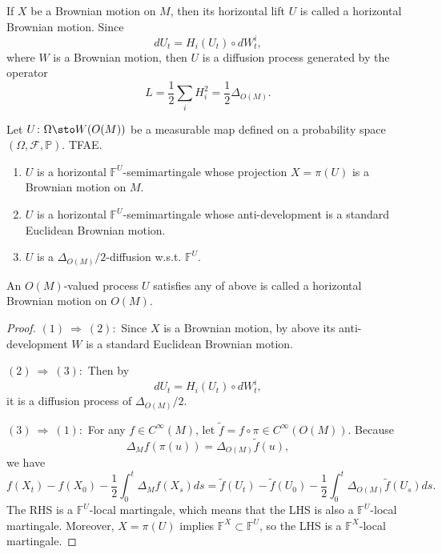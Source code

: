 If $X$ be a Brownian motion on $M$, then its horizontal lift $U$ is called a horizontal Brownian motion. Since
\begin{equation*}
    dU_t = H_i(U_t) \circ dW^i_t,
\end{equation*}
where $W$ is a Brownian motion, then $U$ is a diffusion process generated by the operator
\begin{equation*}
    L = \frac{1}{2} \sum_i H_i^2 = \frac{1}{2}\Delta_{O(M)}.
\end{equation*}

\begin{prop}
    Let $U \colon \Omega \sto W(O(M))$ be a measurable map defined on a probability space $(\Omega,\mathcal{F},\mathbb{P})$. TFAE.
    \begin{enumerate}[label=(\arabic{*})]
        \item $U$ is a horizontal $\mathbb{F}^U$-semimartingale whose projection $X = \pi(U)$ is a Brownian motion on $M$.
        \item $U$ is a horizontal $\mathbb{F}^U$-semimartingale whose anti-development is a standard Euclidean Brownian motion.
        \item $U$ is a $\Delta_{O(M)} / 2$-diffusion w.s.t. $\mathbb{F}^U$.
    \end{enumerate}
\end{prop}
\begin{rmk}
    An $O(M)$-valued process $U$ satisfies any of above is called a horizontal Brownian motion on $O(M)$.
\end{rmk}
\begin{proof}
    $(1)~\Rightarrow~(2):$ Since $X$ is a Brownian motion, by above its anti-development $W$ is a standard Euclidean Brownian motion. 

    $(2)~\Rightarrow~(3):$ Then by
    \begin{equation*}
         dU_t = H_i(U_t) \circ dW^i_t,
    \end{equation*}
    it is a diffusion process of $\Delta_{O(M)} / 2$.

    $(3)~\Rightarrow~(1):$ For any $f \in C^\infty(M)$, let $\widetilde{f} = f \circ \pi \in C^\infty(O(M))$. Because
    \begin{equation*}
        \Delta_M f(\pi(u)) = \Delta_{O(M)} \widetilde{f}(u),
    \end{equation*}
    we have
    \begin{equation*}
        f(X_t) - f(X_0) - \frac{1}{2}\int_0^t\Delta_Mf(X_s)ds = \widetilde{f}(U_t) - \widetilde{f}(U_0) - \frac{1}{2}\int_0^t\Delta_{O(M)}\widetilde{f}(U_s)ds.
    \end{equation*}
    The RHS is a $\mathbb{F}^U$-local martingale, which means that the LHS is also a $\mathbb{F}^U$-local martingale. Moreover, $X = \pi(U)$ implies $\mathbb{F}^X \subset \mathbb{F}^U$, so the LHS is a $\mathbb{F}^X$-local martingale.
\end{proof}
